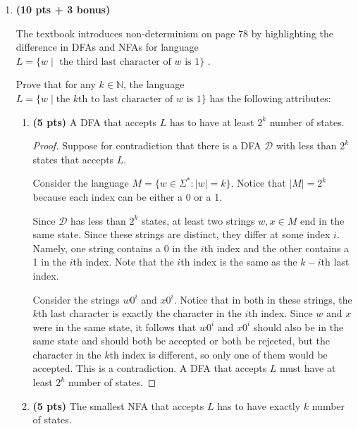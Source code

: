 \documentclass[11pt]{article}
\begin{document}
\begin{enumerate}[label=\textbf{Q\arabic*.}]
\begin{enumerate}[label=\textit{\alph*)}]
\begin{proof}
	\end{proof}

\end{enumerate}


(Continued on the next page)

\newpage

\item \textbf{(10 pts + 3 bonus)}

The textbook introduces non-determinism on page 78 by highlighting the difference in DFAs and NFAs for language $L = \{w \mid \text{ the third last character of } w \text{ is } 1\}$ . 

Prove that for any $k\in \mathbb{N}$, the language $L = \{ w \mid \text{the } k\text{th to last character of } w \text{ is } 1\}$ has the following attributes:


\begin{enumerate}[label=\textit{\alph*)}]
\item \textbf{(5 pts)} A DFA that accepts $L$ has to have at least $2^k$ number of states.

\begin{proof}
	Suppose for contradiction that there is a DFA \(\mathcal{D}\) with less than \(2^k\) states that accepts \(L\).

	Consider the language \(M = \{w \in \Sigma ^* : |w| = k\}\). Notice that \(|M| = 2^k\) because each index can be either a 0 or a 1.

	Since \(\mathcal{D}\) has less than \(2^k\) states, at least two strings \(w,x \in M\) end in the same state. Since these strings are distinct, they differ at some index \(i\). Namely, one string contains a 0 in the \(i\)th index and the other contains a 1 in the \(i\)th index. Note that the \(i\)th index is the same as the \(k-i\)th last index.

	Consider the strings \(w0^i\) and \(x0^i\). Notice that in both in these strings, the \(k\)th last character is exactly the character in the \(i\)th index. Since \(w\) and \(x\) were in the same state, it follows that \(w0^i\) and \(x0^i\) should also be in the same state and should both be accepted or both be rejected, but the character in the \(k\)th index is different, so only one of them would be accepted. This is a contradiction. A DFA that accepts \(L\) must have at least \(2^k\) number of states.

\end{proof}

\item \textbf{(5 pts)} The smallest NFA that accepts $L$ has to have exactly $k$ number of states.


\end{enumerate}
\end{enumerate}
\end{document}
